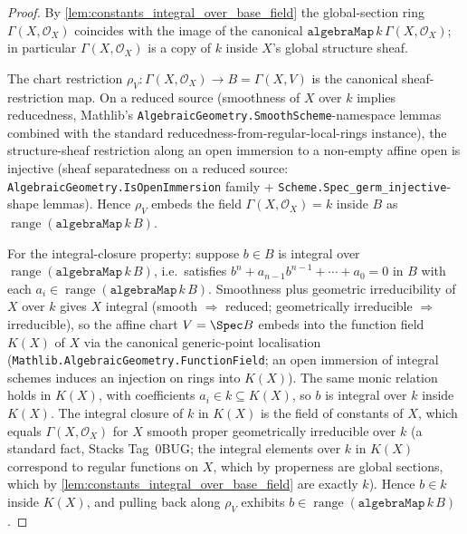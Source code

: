 \begin{proof}
  
  By \cref{lem:constants_integral_over_base_field} the global-section ring \(\Gamma(X, \mathcal O_X)\) coincides with the image of the canonical \(\mathtt{algebraMap}\,k\,\Gamma(X, \mathcal O_X)\); in particular \(\Gamma(X, \mathcal O_X)\) is a copy of \(k\) inside \(X\)'s global structure sheaf.

  The chart restriction \(\rho_V \colon \Gamma(X, \mathcal O_X) \to B = \Gamma(X, V)\) is the canonical sheaf-restriction map. On a reduced source (smoothness of \(X\) over \(k\) implies reducedness, Mathlib's \texttt{AlgebraicGeometry.SmoothScheme}-namespace lemmas combined with the standard reducedness-from-regular-local-rings instance), the structure-sheaf restriction along an open immersion to a non-empty affine open is injective (sheaf separatedness on a reduced source: \texttt{AlgebraicGeometry.IsOpenImmersion} family + \texttt{Scheme.Spec\_germ\_injective}-shape lemmas). Hence \(\rho_V\) embeds the field \(\Gamma(X, \mathcal O_X) = k\) inside \(B\) as \(\operatorname{range}(\mathtt{algebraMap}\,k\,B)\).

  For the integral-closure property: suppose \(b \in B\) is integral over \(\operatorname{range}(\mathtt{algebraMap}\,k\,B)\), i.e.\ satisfies \(b^{n} + a_{n-1} b^{n-1} + \cdots + a_0 = 0\) in \(B\) with each \(a_i \in \operatorname{range}(\mathtt{algebraMap}\,k\,B)\). Smoothness plus geometric irreducibility of \(X\) over \(k\) gives \(X\) integral (smooth \(\Rightarrow\) reduced; geometrically irreducible \(\Rightarrow\) irreducible), so the affine chart \(V = \Spec B\) embeds into the function field \(K(X)\) of \(X\) via the canonical generic-point localisation (\texttt{Mathlib.AlgebraicGeometry.FunctionField}; an open immersion of integral schemes induces an injection on rings into \(K(X)\)). The same monic relation holds in \(K(X)\), with coefficients \(a_i \in k \subseteq K(X)\), so \(b\) is integral over \(k\) inside \(K(X)\). The integral closure of \(k\) in \(K(X)\) is the field of constants of \(X\), which equals \(\Gamma(X, \mathcal O_X)\) for \(X\) smooth proper geometrically irreducible over \(k\) (a standard fact, Stacks Tag~0BUG; the integral elements over \(k\) in \(K(X)\) correspond to regular functions on \(X\), which by properness are global sections, which by \cref{lem:constants_integral_over_base_field} are exactly \(k\)). Hence \(b \in k\) inside \(K(X)\), and pulling back along \(\rho_V\) exhibits \(b \in \operatorname{range}(\mathtt{algebraMap}\,k\,B)\).


\end{proof}
